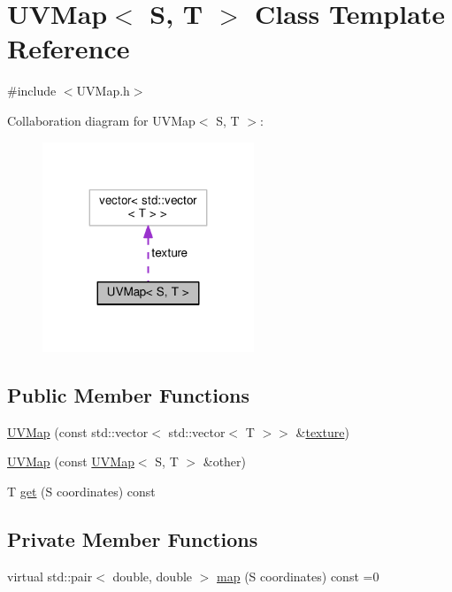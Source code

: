 \hypertarget{classUVMap}{}\section{U\+V\+Map$<$ S, T $>$ Class Template Reference}
\label{classUVMap}


{\ttfamily \#include $<$U\+V\+Map.\+h$>$}



Collaboration diagram for U\+V\+Map$<$ S, T $>$\+:\nopagebreak
\begin{figure}[H]
\begin{center}
\leavevmode
\includegraphics[width=179pt]{classUVMap__coll__graph}
\end{center}
\end{figure}
\subsection*{Public Member Functions}
\begin{DoxyCompactItemize}
\item 
\hyperlink{classUVMap_adc63ebfe75c0e4e3a1dfe47a4c0679f4}{U\+V\+Map} (const std\+::vector$<$ std\+::vector$<$ T $>$$>$ \&\hyperlink{classUVMap_a6804b05501ac1221dd2e20eb43c83637}{texture})
\item 
\hyperlink{classUVMap_a0787e9239f59e850e4c3825d1985d8f3}{U\+V\+Map} (const \hyperlink{classUVMap}{U\+V\+Map}$<$ S, T $>$ \&other)
\item 
T \hyperlink{classUVMap_a26f2022608cfa0682c4c5f46b476d57a}{get} (S coordinates) const 
\end{DoxyCompactItemize}
\subsection*{Private Member Functions}
\begin{DoxyCompactItemize}
\item 
virtual std\+::pair$<$ double, double $>$ \hyperlink{classUVMap_a7e69b96af78122ae897b52f48c13f23e}{map} (S coordinates) const =0
\end{DoxyCompactItemize}
